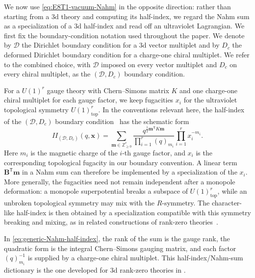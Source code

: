 \documentclass[11pt,a4paper]{article}
\numberwithin{equation}{section}
\begin{document}
We now use \eqref{eq:E8T1-vacuum-Nahm} in the opposite direction: rather than starting from a 3d theory and computing its half-index, we regard the Nahm sum as a specialization of a 3d half-index and read off an ultraviolet Lagrangian.  We first fix the boundary-condition notation used throughout the paper.  We denote by $\mathcal D$ the Dirichlet boundary condition for a 3d vector multiplet and by $D_c$ the deformed Dirichlet boundary condition for a charge-one chiral multiplet.  We refer to the combined choice, with $\mathcal D$ imposed on every vector multiplet and $D_c$ on every chiral multiplet, as the $(\mathcal D,D_c)$ boundary condition.

For a $U(1)^r$ gauge theory with Chern--Simons matrix $K$ and one charge-one chiral multiplet for each gauge factor, we keep fugacities $x_i$ for the ultraviolet topological symmetry $U(1)_{\mathrm{top}}^r$.  In the conventions relevant here, the half-index of the $(\mathcal D,D_c)$ boundary condition~\cite{Dimofte:2017tpi} has the schematic form
\begin{equation}
  I\!\!I_{(\mathcal D,D_c)}(q,\boldsymbol x)
  =
  \sum_{\boldsymbol m\in\mathbb Z_{\geq0}^{r}}
  \frac{
    q^{\frac12\boldsymbol m^{\mathsf T}K\boldsymbol m}
  }{
    \prod_{i=1}^{r}(q)_{m_i}
  }
  \prod_{i=1}^{r}x_i^{-m_i}.
  \label{eq:generic-Nahm-half-index}
\end{equation}
Here $m_i$ is the magnetic charge of the $i$-th gauge factor, and $x_i$ is the corresponding topological fugacity in our boundary convention.  A linear term $\boldsymbol B^{\mathsf T}\boldsymbol m$ in a Nahm sum can therefore be implemented by a specialization of the $x_i$.  More generally, the fugacities need not remain independent after a monopole deformation: a monopole superpotential breaks a subspace of $U(1)_{\mathrm{top}}^r$, while an unbroken topological symmetry may mix with the $R$-symmetry.  The character-like half-index is then obtained by a specialization compatible with this symmetry breaking and mixing, as in related constructions of rank-zero theories~\cite{Gaiotto:2024ioj}.

In \eqref{eq:generic-Nahm-half-index}, the rank of the sum is the gauge rank, the quadratic form is the integral Chern--Simons gauging matrix, and each factor $(q)_{m_i}^{-1}$ is supplied by a charge-one chiral multiplet.  This half-index/Nahm-sum dictionary is the one developed for 3d rank-zero theories in \cite{GangKimParkStubbs:2024Nahm}.
\end{document}
